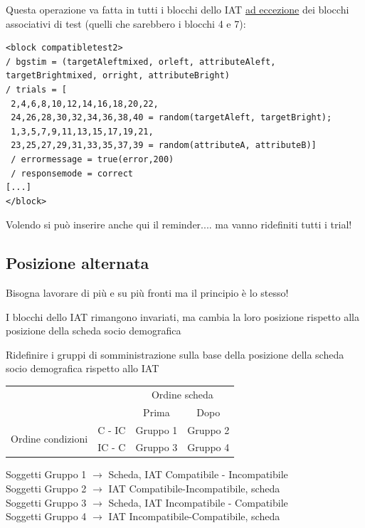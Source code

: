 \documentclass{beamer}
\begin{document}
\begin{frame}[fragile]
	Questa operazione va fatta in tutti i blocchi dello IAT \underline{ad eccezione} dei blocchi associativi di test (quelli che sarebbero i blocchi 4 e 7): 
	
	\begin{footnotesize}
		\begin{Verbatim}[commandchars=\\\{\}]
<block compatibletest2>
/ bgstim = (targetAleftmixed, orleft, attributeAleft, targetBrightmixed, orright, attributeBright)
/ trials = [
 2,4,6,8,10,12,14,16,18,20,22,
 24,26,28,30,32,34,36,38,40 = random(targetAleft, targetBright);
 1,3,5,7,9,11,13,15,17,19,21,
 23,25,27,29,31,33,35,37,39 = random(attributeA, attributeB)]
 / errormessage = true(error,200)
 / responsemode = correct
[...]
</block>
	\end{Verbatim}
	\end{footnotesize}
Volendo si può inserire anche qui il reminder.... ma vanno ridefiniti tutti i trial!
\end{frame}

\subsection*{Posizione alternata}

\begin{frame}
	Bisogna lavorare di più e su più fronti ma il principio è lo stesso!
	
	I blocchi dello IAT rimangono invariati, ma cambia la loro posizione rispetto alla posizione della scheda socio demografica
	
	Ridefinire i gruppi di somministrazione sulla base della posizione della scheda socio demografica rispetto allo IAT
	

	\begin{tabular}{c  c  |c | c |}
		& \multicolumn{1}{c}{} & \multicolumn{2}{c}{Ordine scheda} \\
		& \multicolumn{1}{c}{} & \multicolumn{1}{c}{Prima} & \multicolumn{1}{c}{Dopo} \\
		\cline{3-4}
		\multirow{2}{*}{Ordine condizioni}& C - IC & Gruppo 1 &  Gruppo 2 \\
		\cline{3-4}
		& IC - C & Gruppo 3 & Gruppo 4 \\
		\cline{3-4} 
	\end{tabular}

\vspace{3mm}
\begin{small}
Soggetti Gruppo 1 $\rightarrow$ Scheda, IAT Compatibile - Incompatibile \\
Soggetti Gruppo 2 $\rightarrow$ IAT Compatibile-Incompatibile, scheda\\
Soggetti Gruppo 3  $\rightarrow$ Scheda, IAT Incompatibile - Compatibile \\
Soggetti Gruppo 4 $\rightarrow$ IAT  Incompatibile-Compatibile, scheda
\end{small}
\end{frame}
\end{document}
